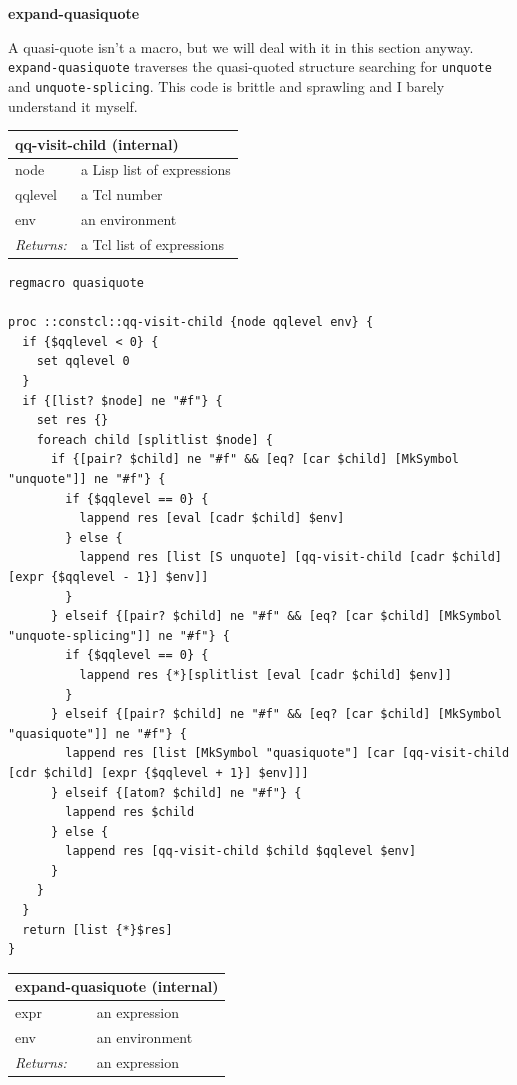 \documentclass[twoside,9pt]{report}
\begin{document}
\textbf{expand-quasiquote}


A quasi-quote isn't a macro, but we will deal with it in this section anyway. \texttt{expand-quasiquote} traverses the quasi-quoted structure searching for \texttt{unquote} and \texttt{unquote-splicing}. This code is brittle and sprawling and I barely understand it myself.

\begin{tabular}{ |l l| }
\hline
\multicolumn{2}{|l|}{qq-visit-child (internal)} \\
\hline
node & a Lisp list of expressions \\
qqlevel & a Tcl number \\
env & an environment \\
\textit{Returns:} & a Tcl list of expressions \\
\hline
\end{tabular}

\noindent\makebox[\linewidth]{\rule{\linewidth}{0.4pt}}
\begin{lstlisting}
regmacro quasiquote
 
proc ::constcl::qq-visit-child {node qqlevel env} {
  if {$qqlevel < 0} {
    set qqlevel 0
  }
  if {[list? $node] ne "#f"} {
    set res {}
    foreach child [splitlist $node] {
      if {[pair? $child] ne "#f" && [eq? [car $child] [MkSymbol "unquote"]] ne "#f"} {
        if {$qqlevel == 0} {
          lappend res [eval [cadr $child] $env]
        } else {
          lappend res [list [S unquote] [qq-visit-child [cadr $child] [expr {$qqlevel - 1}] $env]]
        }
      } elseif {[pair? $child] ne "#f" && [eq? [car $child] [MkSymbol "unquote-splicing"]] ne "#f"} {
        if {$qqlevel == 0} {
          lappend res {*}[splitlist [eval [cadr $child] $env]]
        }
      } elseif {[pair? $child] ne "#f" && [eq? [car $child] [MkSymbol "quasiquote"]] ne "#f"} {
        lappend res [list [MkSymbol "quasiquote"] [car [qq-visit-child [cdr $child] [expr {$qqlevel + 1}] $env]]] 
      } elseif {[atom? $child] ne "#f"} {
        lappend res $child
      } else {
        lappend res [qq-visit-child $child $qqlevel $env]
      }
    }
  }
  return [list {*}$res]
}
\end{lstlisting}
\noindent\makebox[\linewidth]{\rule{\linewidth}{0.4pt}}
\begin{tabular}{ |l l| }
\hline
\multicolumn{2}{|l|}{expand-quasiquote (internal)} \\
\hline
expr & an expression \\
env & an environment \\
\textit{Returns:} & an expression \\
\hline
\end{tabular}
\end{document}
